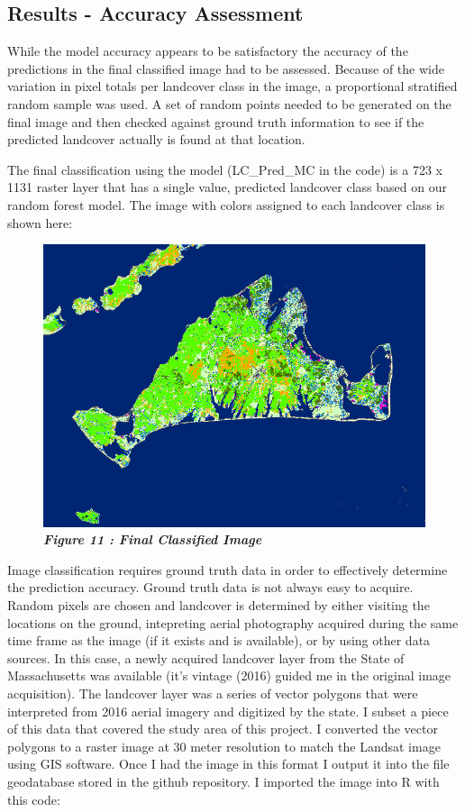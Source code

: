 \documentclass[]{article}
\begin{document}
\subsection{Results - Accuracy
Assessment}\label{results---accuracy-assessment}

While the model accuracy appears to be satisfactory the accuracy of the
predictions in the final classified image had to be assessed. Because of
the wide variation in pixel totals per landcover class in the image, a
proportional stratified random sample was used. A set of random points
needed to be generated on the final image and then checked against
ground truth information to see if the predicted landcover actually is
found at that location.

The final classification using the model (LC\_Pred\_MC in the code) is a
723 x 1131 raster layer that has a single value, predicted landcover
class based on our random forest model. The image with colors assigned
to each landcover class is shown here:

\begin{figure}
\centering
\includegraphics{images/finalClassImg.png}
\caption{\textbf{\emph{Figure 11 : Final Classified Image}}}
\end{figure}

Image classification requires ground truth data in order to effectively
determine the prediction accuracy. Ground truth data is not always easy
to acquire. Random pixels are chosen and landcover is determined by
either visiting the locations on the ground, intepreting aerial
photography acquired during the same time frame as the image (if it
exists and is available), or by using other data sources. In this case,
a newly acquired landcover layer from the State of Massachusetts was
available (it's vintage (2016) guided me in the original image
acquisition). The landcover layer was a series of vector polygons that
were interpreted from 2016 aerial imagery and digitized by the state. I
subset a piece of this data that covered the study area of this project.
I converted the vector polygons to a raster image at 30 meter resolution
to match the Landsat image using GIS software. Once I had the image in
this format I output it into the file geodatabase stored in the github
repository. I imported the image into R with this code:
\end{document}
